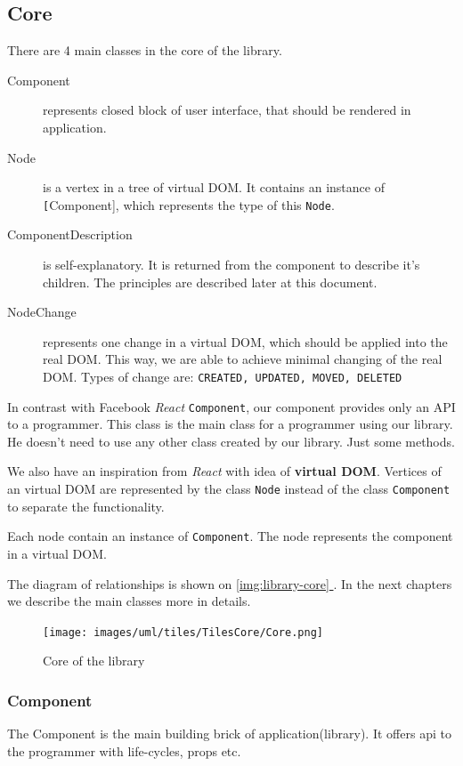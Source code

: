 \documentclass[oneside, 12pt]{book}
\newcommand*{\fullref}[1]{\hyperref[{#1}]{\autoref*{#1} \nameref*{#1}}}
\newcommand{\react}[0]{\textit{React} }
\newcommand{\facebook}[0]{Facebook }
\begin{document}
  \subsection{Core}\label{subsec:our-architecture-core}
    There are 4 main classes in the core of the library.
    \begin{description}
      \item[Component] 
        represents closed block of user interface, 
        that should be rendered in application.
      \item[Node]
        is a vertex in a tree of virtual DOM. 
        It contains an instance of \texttt[Component], which represents the type of this \texttt{Node}.
      \item[ComponentDescription]
        is self-explanatory. 
        It is returned from the component to describe it's children. 
        The principles are described later at this document.
      \item[NodeChange]
        represents one change in a virtual DOM, which should be applied into the real DOM. 
        This way, we are able to achieve minimal changing of the real DOM. 
        Types of change are: \texttt{CREATED, UPDATED, MOVED, DELETED}
    \end{description}

    In contrast with \facebook \react \texttt{Component}, our component provides only an API to a programmer.
    This class is the main class for a programmer using our library. 
    He doesn't need to use any other class created by our library. 
    Just some methods.

    We also have an inspiration from \react with idea of \textbf{virtual DOM}. 
    Vertices of an virtual DOM are represented by the class \texttt{Node} instead of the class \texttt{Component} to separate the functionality. 

    Each node contain an instance of \texttt{Component}. 
    The node represents the component in a virtual DOM.
    
    The diagram of relationships is shown on \fullref{img:library-core}. 
    In the next chapters we describe the main classes more in details.
    \begin{figure}[h]
    \centering  
      \texttt{[image: images/uml/tiles/TilesCore/Core.png]}
      \caption{Core of the library}
      \label{img:library-core}
    \end{figure}

    \subsubsection{Component}\label{subsubsec:our-architecture-core-component}
      The Component is the main building brick of application(library). 
      It offers api to the programmer with life-cycles, props etc. 
\end{document}
